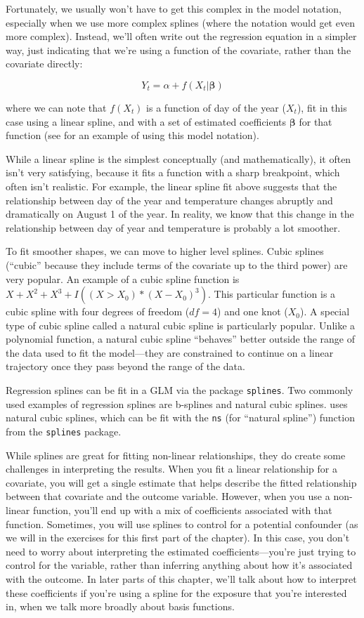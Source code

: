 \documentclass[
]{book}
\begin{document}
Fortunately, we usually won't have to get this complex in the model notation,
especially when we use more complex splines (where the notation would get even
more complex). Instead, we'll often write out the
regression equation in a simpler way, just indicating that we're using a function
of the covariate, rather than the covariate directly:

\[
Y_t = \alpha + f(X_t | \mathbf{\beta})
\]

where we can note that \(f(X_t)\) is a function of day of the year (\(X_t\)), fit in
this case using a linear spline, and with a set of estimated coefficients \(\mathbf{\beta}\) for that
function (see \citet{armstrong2006models} for an example of using this model notation).

While a linear spline is the simplest conceptually (and mathematically), it often
isn't very satisfying, because it fits a function with a sharp breakpoint, which
often isn't realistic. For example, the linear spline fit above suggests that the
relationship between day of the year and temperature changes abruptly and dramatically
on August 1 of the year. In reality, we know that this change in the relationship
between day of year and temperature is probably a lot smoother.

To fit smoother shapes, we can move to higher level splines. Cubic splines
(``cubic'' because they include terms of the covariate up to the third power) are
very popular.
An example of a cubic spline
function is \(X+X^{2}+X^{3}+I((X>X_{0})*(X-X_{0})^3)\). This particular function is
a cubic spline with four degrees of freedom (\(df=4\)) and one knot (\(X_{0}\)).
A special type of cubic spline called a natural cubic spline is particularly popular.
Unlike a polynomial function, a natural cubic spline ``behaves'' better outside
the range of the data used to fit the model---they are constrained to continue
on a linear trajectory once they pass beyond the range of the data.

Regression splines can be fit in a GLM via the package \texttt{splines}. Two commonly
used examples of regression splines are b-splines and natural cubic
splines. \citet{vicedo2019hands} uses natural cubic splines, which can be fit with the
\texttt{ns} (for ``natural spline'') function from the \texttt{splines} package.

While splines are great for fitting non-linear relationships, they do create some
challenges in interpreting the results. When you fit a linear relationship for
a covariate, you will get a single estimate that helps describe the fitted relationship
between that covariate and the outcome variable. However, when you use a non-linear
function, you'll end up with a mix of coefficients associated with that function.
Sometimes, you will use splines to control for a potential confounder (as we
will in the exercises for this first part of the chapter). In this case, you don't
need to worry about interpreting the estimated coefficients---you're just trying to
control for the variable, rather than inferring anything about how it's associated
with the outcome.
In later parts of this chapter, we'll talk about how to interpret these coefficients
if you're using a spline for the exposure that you're interested in, when we talk
more broadly about basis functions.
\end{document}
